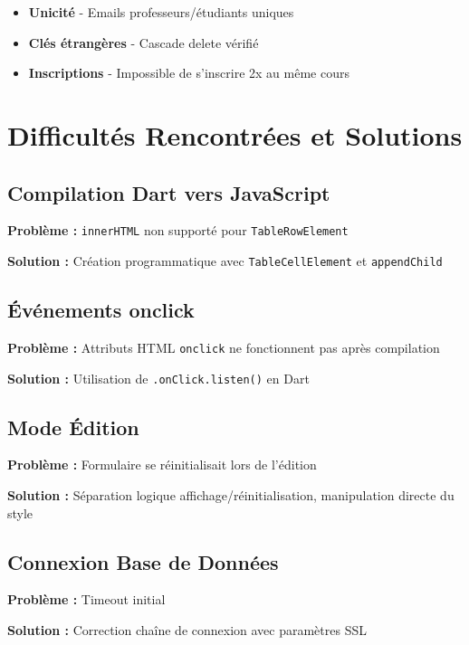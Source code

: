 \documentclass{article}
\begin{document}
\begin{itemize}
    \item \textbf{Unicité} - Emails professeurs/étudiants uniques
    \item \textbf{Clés étrangères} - Cascade delete vérifié
    \item \textbf{Inscriptions} - Impossible de s'inscrire 2x au même cours
\end{itemize}

\clearpage
\section{Difficultés Rencontrées et Solutions}

\subsection{Compilation Dart vers JavaScript}

\textbf{Problème :} \texttt{innerHTML} non supporté pour \texttt{TableRowElement}

\textbf{Solution :} Création programmatique avec \texttt{TableCellElement} et \texttt{appendChild}

\subsection{Événements onclick}

\textbf{Problème :} Attributs HTML \texttt{onclick} ne fonctionnent pas après compilation

\textbf{Solution :} Utilisation de \texttt{.onClick.listen()} en Dart

\subsection{Mode Édition}

\textbf{Problème :} Formulaire se réinitialisait lors de l'édition

\textbf{Solution :} Séparation logique affichage/réinitialisation, manipulation directe du style

\subsection{Connexion Base de Données}

\textbf{Problème :} Timeout initial

\textbf{Solution :} Correction chaîne de connexion avec paramètres SSL
\end{document}
